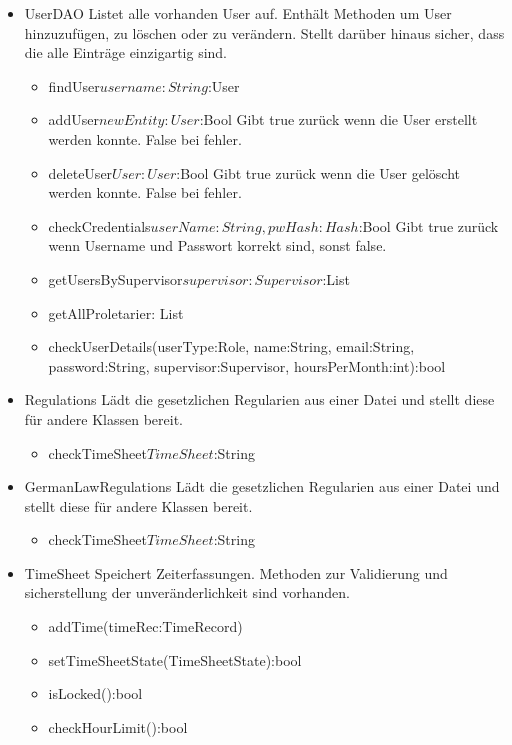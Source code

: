 \begin{itemize}
            \item{UserDAO}
                Listet alle vorhanden User auf. Enthält Methoden um User hinzuzufügen, zu löschen oder zu verändern. Stellt darüber hinaus sicher, dass die alle Einträge einzigartig sind.
                \begin{itemize}
                   \item{findUser\(username:String\):User}
                   \item{addUser\(newEntity:User\):Bool}
                    Gibt true zurück wenn die User erstellt werden konnte.
                    False bei fehler.
                   \item{deleteUser\(User:User\):Bool}
                    Gibt true zurück wenn die User gelöscht werden konnte.
                    False bei fehler.
                   \item{checkCredentials\(userName:String, pwHash:Hash\):Bool}
                   Gibt true zurück wenn Username und Passwort korrekt sind, sonst false.
                   \item{getUsersBySupervisor\(supervisor:Supervisor\):List}
                   \item{getAllProletarier\(\): List}
                   \item{checkUserDetails(userType:Role, name:String, email:String, password:String, supervisor:Supervisor, hoursPerMonth:int):bool}
                \end{itemize}

            \item{Regulations}
                Lädt die gesetzlichen Regularien aus einer Datei und stellt diese für andere Klassen bereit.
                \begin{itemize}
                    \item{checkTimeSheet\(TimeSheet\):String}
                \end{itemize}

            \item{GermanLawRegulations}
                Lädt die gesetzlichen Regularien aus einer Datei und stellt diese für andere Klassen bereit.
                \begin{itemize}
                    \item{checkTimeSheet\(TimeSheet\):String}
                \end{itemize}

            \item{TimeSheet}
                Speichert Zeiterfassungen. Methoden zur Validierung und sicherstellung der unveränderlichkeit sind vorhanden.
                \begin{itemize}
                    \item{addTime(timeRec:TimeRecord)}
                    \item{setTimeSheetState(TimeSheetState):bool}
                    \item{isLocked():bool}
                    \item{checkHourLimit():bool}
                \end{itemize}


\end{itemize}

